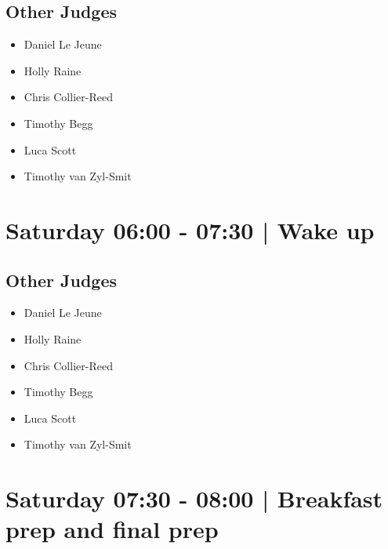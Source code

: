 \documentclass[10pt, A5]{article}
\begin{document}
                
        \subsection*{Other Judges}
        
            \begin{itemize}
                            \item Daniel Le Jeune
                            \item Holly Raine
                            \item Chris Collier-Reed
                            \item Timothy Begg
                            \item Luca Scott
                            \item Timothy van Zyl-Smit
                        \end{itemize}
        

            \section*{Saturday 06:00
        -
        07:30
        |
         Wake up}
        
                
        \subsection*{Other Judges}
        
            \begin{itemize}
                            \item Daniel Le Jeune
                            \item Holly Raine
                            \item Chris Collier-Reed
                            \item Timothy Begg
                            \item Luca Scott
                            \item Timothy van Zyl-Smit
                        \end{itemize}
        

            \section*{Saturday 07:30
        -
        08:00
        |
         Breakfast prep and final prep}
        
\end{document}
